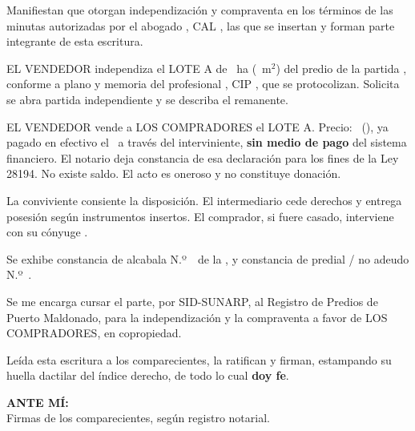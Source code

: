 \documentclass[12pt,a4paper]{article}
\begin{document}
Manifiestan que otorgan independización y compraventa en los términos de las minutas autorizadas por el abogado \AbogadoNombre, CAL \ColegiaturaAbogado, las que se insertan y forman parte integrante de esta escritura.

EL VENDEDOR independiza el LOTE A de \AreaIndependizarHa\ ha (\AreaIndependizarMetros\ m$^2$) del predio de la partida \PartidaMatriz, conforme a plano y memoria del profesional \IngenieroNombre, CIP \IngenieroCIP, que se protocolizan. Solicita se abra partida independiente y se describa el remanente.

EL VENDEDOR vende a LOS COMPRADORES el LOTE A. Precio: \MontoPago\ (\MontoPagoLetras), ya pagado en efectivo el \FechaPago\ a través del interviniente, \textbf{sin medio de pago} del sistema financiero. El notario deja constancia de esa declaración para los fines de la Ley 28194. No existe saldo. El acto es oneroso y no constituye donación.

La conviviente consiente la disposición. El intermediario cede derechos y entrega posesión según instrumentos insertos. El comprador, si fuere casado, interviene con su cónyuge \CompradorConyuge.

Se exhibe constancia de alcabala N.º\ \linea[3.2cm]\ de la \Municipalidad, y constancia de predial / no adeudo N.º\ \linea[3.2cm].

Se me encarga cursar el parte, por SID-SUNARP, al Registro de Predios de Puerto Maldonado, para la independización y la compraventa a favor de LOS COMPRADORES, en copropiedad.

Leída esta escritura a los comparecientes, la ratifican y firman, estampando su huella dactilar del índice derecho, de todo lo cual \textbf{doy fe}.

\vspace{0.9em}
\noindent \textbf{ANTE MÍ:}\\[0.15em]
Firmas de los comparecientes, según registro notarial.

\vspace{0.25em}
\end{document}
